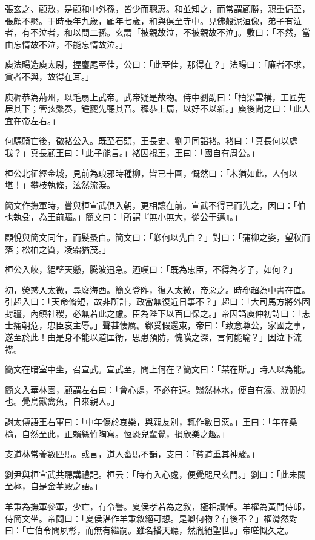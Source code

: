 張玄之、顧敷，是顧和中外孫，皆少而聰惠。和並知之，而常謂顧勝，親重偏至，張頗不懕。于時張年九歲，顧年七歲，和與俱至寺中。見佛般泥洹像，弟子有泣者，有不泣者，和以問二孫。玄謂「被親故泣，不被親故不泣」。敷曰：「不然，當由忘情故不泣，不能忘情故泣。」

庾法畼造庾太尉，握麈尾至佳，公曰：「此至佳，那得在？」法畼曰：「廉者不求，貪者不與，故得在耳。」

庾穉恭為荊州，以毛扇上武帝。武帝疑是故物。侍中劉劭曰：「柏梁雲構，工匠先居其下；管弦繁奏，鍾夔先聽其音。穉恭上扇，以好不以新。」庾後聞之曰：「此人宜在帝左右。」

何驃騎亡後，徵褚公入。既至石頭，王長史、劉尹同詣褚。褚曰：「真長何以處我？」真長顧王曰：「此子能言。」褚因視王，王曰：「國自有周公。」

桓公北征經金城，見前為琅邪時種柳，皆已十圍，慨然曰：「木猶如此，人何以堪！」攀枝執條，泫然流淚。

簡文作撫軍時，嘗與桓宣武俱入朝，更相讓在前。宣武不得已而先之，因曰：「伯也執殳，為王前驅。」簡文曰：「所謂『無小無大，從公于邁』。」

顧悅與簡文同年，而髮蚤白。簡文曰：「卿何以先白？」對曰：「蒲柳之姿，望秋而落；松柏之質，凌霜猶茂。」

桓公入峽，絕壁天懸，騰波迅急。迺嘆曰：「既為忠臣，不得為孝子，如何？」

初，熒惑入太微，尋廢海西。簡文登阼，復入太微，帝惡之。時郗超為中書在直。引超入曰：「天命脩短，故非所計，政當無復近日事不？」超曰：「大司馬方將外固封疆，內鎮社稷，必無若此之慮。臣為陛下以百口保之。」帝因誦庾仲初詩曰：「志士痛朝危，忠臣哀主辱。」聲甚悽厲。郗受假還東，帝曰：「致意尊公，家國之事，遂至於此！由是身不能以道匡衛，思患預防，愧嘆之深，言何能喻？」因泣下流襟。

簡文在暗室中坐，召宣武。宣武至，問上何在？簡文曰：「某在斯。」時人以為能。

簡文入華林園，顧謂左右曰：「會心處，不必在遠。翳然林水，便自有濠、濮閒想也。覺鳥獸禽魚，自來親人。」

謝太傅語王右軍曰：「中年傷於哀樂，與親友別，輒作數日惡。」王曰：「年在桑榆，自然至此，正賴絲竹陶寫。恆恐兒輩覺，損欣樂之趣。」

支道林常養數匹馬。或言，道人畜馬不韻，支曰：「貧道重其神駿。」

劉尹與桓宣武共聽講禮記。桓云：「時有入心處，便覺咫尺玄門。」劉曰：「此未關至極，自是金華殿之語。」

羊秉為撫軍參軍，少亡，有令譽。夏侯孝若為之敘，極相讚悼。羊權為黃門侍郎，侍簡文坐。帝問曰：「夏侯湛作羊秉敘絕可想。是卿何物？有後不？」權潸然對曰：「亡伯令問夙彰，而無有繼嗣。雖名播天聽，然胤絕聖世。」帝嗟慨久之。

